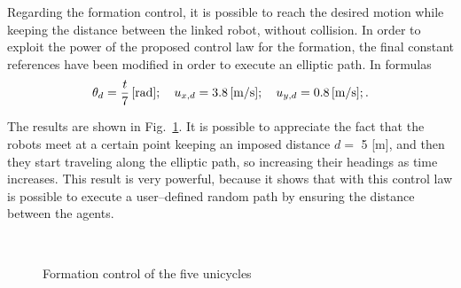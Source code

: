 \documentclass[11pt]{article}
\begin{document}
Regarding the formation control, it is possible to reach the desired motion while keeping the distance between the linked robot, without collision. In order to exploit the power of the proposed control law for the formation, the final constant references have been modified in order to execute an elliptic path.  In formulas
\[
\theta_d = \dfrac{t}{7} \, \textup{[rad]}; \quad u_{x,d} = 3.8 \, \textup{[m/s]}; \quad u_{y,d} = 0.8 \, \textup{[m/s]};.
\]

The results are shown in Fig.~\ref{results_formation_5}. It is possible to appreciate the fact that the robots meet at a certain point keeping an imposed distance $d =$ 5 [m], and then they start traveling along the elliptic path, so increasing their headings as time increases. This result is very powerful, because it shows that with this control law is possible to execute a user--defined random path by ensuring the distance between the agents.

\begin{figure}[H]
\centering
{} \quad
{} \\
\caption{Formation control of the five unicycles}
\label{results_formation_5}
\end{figure}

\end{document}
